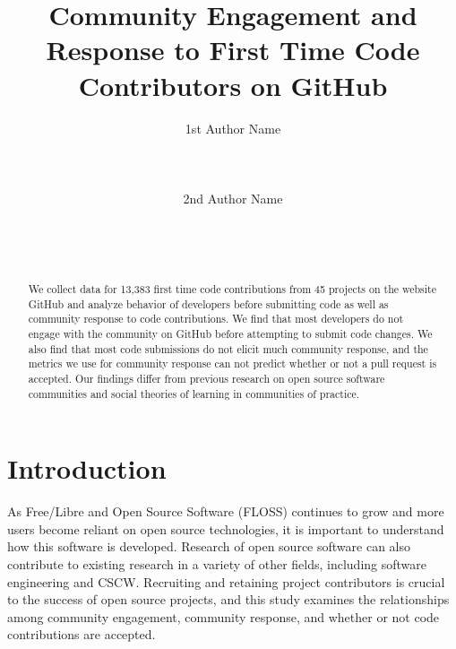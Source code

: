 \documentclass{sigchi}
\begin{document}
\title{Community Engagement and Response to First Time Code Contributors on GitHub}

\author{
  \alignauthor 1st Author Name\\
    \\
    \\
    \\
  \alignauthor 2nd Author Name\\
    \\
    \\
    \\
}

\maketitle                %



\begin{abstract}           %
We collect data for 13,383 first time code contributions from 45 projects on the
website GitHub and analyze behavior of developers before submitting code as well
as community response to code contributions. We find that most developers do not
engage with the community on GitHub before attempting to submit code changes. We
also find that most code submissions do not elicit much community response, and
the metrics we use for community response can not predict whether or not a pull
request is accepted. Our findings differ from previous research on open source
software communities and social theories of learning in communities of practice.
\end{abstract}

\section{Introduction}

As Free/Libre and Open Source Software (FLOSS) continues to grow and more users become reliant on open
source technologies, it is important to understand how this software is
developed. Research of open source software can also contribute to existing
research in a variety of other fields, including software engineering and CSCW. Recruiting and retaining project contributors is crucial to the success of open source 
projects, and this study examines the relationships among community engagement, community response, and whether or not code contributions are accepted. 
\end{document}
